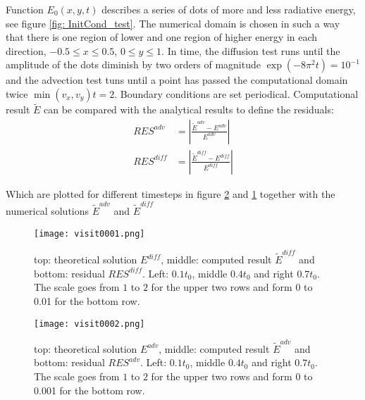 Function $E_0(x,y,t)$ describes a series of dots of more and less radiative energy, see figure \ref{fig: InitCond_test}. The numerical domain is chosen in such a way that there is one region of lower and one region of higher energy in each direction, $-0.5 \leq x \leq 0.5$, $0 \leq y \leq 1$. In time, the diffusion test runs until the amplitude of the dots diminish by two orders of magnitude $\exp(-8 \pi^2 t)  = 10^{-1}$ and the advection test tuns until a point has passed the computational domain twice $ \min(v_x, v_y) t = 2 $. Boundary conditions are set periodical. Computational result $\tilde{E}$ can be compared with the analytical results to define the residuals:
\begin{align}
RES^{adv} &= \left|\frac{\tilde{E}^{adv} - E^{adv}}{E^{adv}}\right| \\
RES^{diff} &= \left|\frac{\tilde{E}^{diff} - E^{diff}}{E^{diff}}\right| 
\end{align}

Which are plotted for different timesteps in figure \ref{fig: test_advection} and \ref{fig: test_diffusion} together with the numerical solutions $\tilde{E}^{adv}$ and $\tilde{E}^{diff}$


\begin{figure}
\texttt{[image: visit0001.png]}
\label{fig: test_diffusion}
\caption{top: theoretical solution $E^{diff}$, middle: computed result $\tilde{E}^{diff}$ and bottom: residual $RES^{diff}$. Left: $0.1 t_0$, middle $0.4 t_0$ and right $0.7 t_0$. The scale goes from $1$ to $2$ for the upper two rows and form 0 to 0.01 for the bottom row.}
\end{figure}

\begin{figure}
\texttt{[image: visit0002.png]}
\label{fig: test_advection}
\caption{top: theoretical solution $E^{adv}$, middle: computed result $\tilde{E}^{adv}$ and bottom: residual $RES^{adv}$. Left: $0.1 t_0$, middle $0.4 t_0$ and right $0.7 t_0$. The scale goes from $1$ to $2$ for the upper two rows and form 0 to 0.001 for the bottom row.}
\end{figure}



